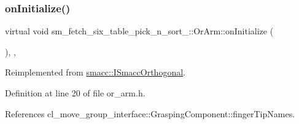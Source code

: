 \subsubsection{\texorpdfstring{on\+Initialize()}{onInitialize()}}
{\footnotesize\ttfamily virtual void sm\+\_\+fetch\+\_\+six\+\_\+table\+\_\+pick\+\_\+n\+\_\+sort\+\_\+::\+Or\+Arm\+::on\+Initialize (\begin{DoxyParamCaption}{ }\end{DoxyParamCaption})\hspace{0.3cm}{\ttfamily [inline]}, {\ttfamily [override]}, {\ttfamily [virtual]}}



Reimplemented from \hyperlink{classsmacc_1_1ISmaccOrthogonal_a6bb31c620cb64dd7b8417f8705c79c7a}{smacc\+::\+I\+Smacc\+Orthogonal}.



Definition at line 20 of file or\+\_\+arm.\+h.



References cl\+\_\+move\+\_\+group\+\_\+interface\+::\+Grasping\+Component\+::finger\+Tip\+Names.


